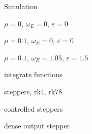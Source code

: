 \begin{frame}[fragile]
 Simulation

 $\mu=0$, $\omega_E = 0$, $\varepsilon=0$

 $\mu=0.1$, $\omega_E = 0$, $\varepsilon=0$

 $\mu=0.1$, $\omega_E = 1.05$, $\varepsilon=1.5$
\end{frame}


\begin{frame}[fragile]
 integrate functions
\end{frame}

\begin{frame}[fragile]
 steppers, rk4, rk78
\end{frame}

\begin{frame}[fragile]
 controlled steppers
\end{frame}

\begin{frame}[fragile]
 dense output stepper
\end{frame}



